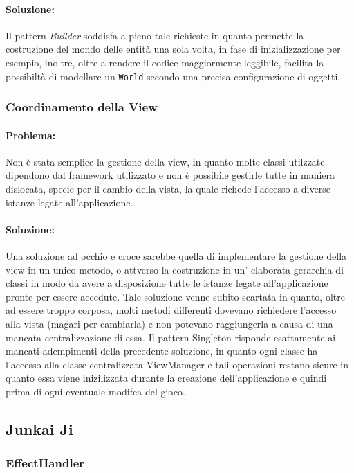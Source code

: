 \documentclass[a4paper,12pt]{report}
\begin{document}
	\paragraph{Soluzione:} Il pattern \textit{Builder} soddisfa a pieno tale richieste in quanto permette la costruzione del mondo delle entità una sola volta, in fase di inizializzazione per esempio, inoltre, oltre a rendere il codice maggiormente leggibile, facilita la possibiltà di modellare un      \texttt{World} secondo una precisa configurazione di oggetti.
	
	
	\subsubsection{Coordinamento della View}
	
	\paragraph{Problema:} Non è stata semplice la gestione della view, in quanto molte classi utilzzate dipendono dal framework utilizzato e non è possibile gestirle tutte in maniera dislocata, specie per il cambio della vista, la quale richede l'accesso a diverse istanze legate all'applicazione.
	
	\paragraph{Soluzione:} Una soluzione ad occhio e croce sarebbe quella di implementare la gestione della view in un unico metodo, o attverso la costruzione in un' elaborata gerarchia di classi in modo da avere a disposizione tutte le istanze legate all'applicazione pronte per essere accedute. Tale soluzione venne subito scartata in quanto, oltre ad essere troppo corposa, molti metodi differenti dovevano richiedere 
	l'accesso alla vista (magari per cambiarla) e non potevano raggiungerla a causa di una mancata centralizzazione di essa. Il pattern {Singleton} risponde esattamente ai mancati adempimenti della precedente soluzione, in quanto ogni classe ha l'accesso alla classe centralizzata {ViewManager} e tali operazioni restano sicure in quanto essa viene inizilizzata durante la creazione dell'applicazione e quindi prima di ogni eventuale modifca del gioco.

 \subsection{Junkai Ji}
\subsubsection{EffectHandler}
\end{document}
